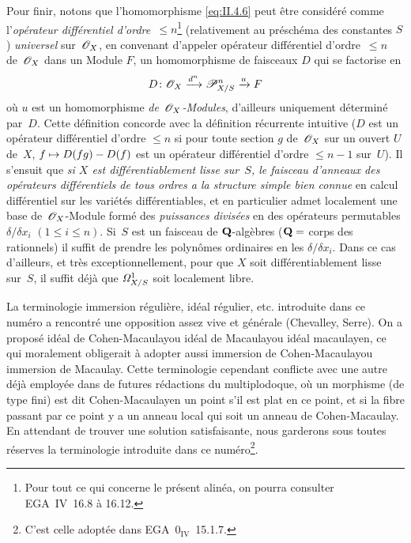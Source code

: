 \begin{remarques}
Pour finir, notons que l'homomorphisme \eqref{eq:II.4.6} peut \^etre
consid\'er\'e comme l'\emph{opé\-ra\-teur différentiel
d'ordre}~$\leq n$\footnote{Pour tout ce qui concerne le pr\'esent
alin\'ea, on pourra consulter EGA~IV~16.8 \`a 16.12.}
(relativement au pr\'esch\'ema des constantes $S$)
\emph{universel}
sur~$\cal{O}_X$, en convenant d'appeler op\'erateur diff\'erentiel
d'ordre~$\leq n$
de~$\cal{O}_X$ dans un Module $F$, un homomorphisme de faisceaux $D$
qui se factorise en
$$
D\colon \cal{O}_X\lto{d^n} \cal{P}_{X/S}^n\lto{u} F
$$
o\`u $u$ est un homomorphisme \emph{de~$\cal{O}_X$-Modules},
d'ailleurs uniquement d\'etermin\'e par~$D$. Cette d\'efinition
concorde avec la d\'efinition r\'ecurrente intuitive ($D$ est un
op\'erateur diff\'erentiel d'ordre $\leq n$ si pour toute section
$g$ de~$\cal{O}_X$ sur un ouvert $U$ de~$X$, $f\mto D(fg)-D(f)$ est
un op\'erateur diff\'erentiel d'ordre $\leq n-1$ sur~$U$). Il
s'ensuit que \emph{si $X$ est différentiablement lisse sur~$S$, le
faisceau d'anneaux des opérateurs différentiels de tous ordres
a la structure simple bien connue} en calcul diff\'erentiel sur les
vari\'et\'es diff\'erentiables, et en particulier admet
localement une base de~$\cal{O}_X$-Module
form\'e 
des \emph{puissances divisées} en des op\'erateurs permutables
$\delta/\delta x_i$ $(1\leq i\leq n)$. Si~$S$ est un faisceau de
$\QQ$-alg\`ebres ($\QQ=$ corps des rationnels) il suffit de prendre
les polyn\^omes ordinaires en les $\delta/\delta x_i$. Dans ce cas
d'ailleurs, et tr\`es exceptionnellement, pour que $X$ soit
diff\'erentiablement lisse sur~$S$, il suffit d\'ej\`a que
$\it{\Omega}_{X/S}^1$ soit localement libre.
\end{remarques}

\begin{remarque}
\label{II.4.19}
La terminologie \og immersion r\'eguli\`ere\fg, \og id\'eal
r\'egulier\fg, etc. introduite dans ce num\'ero a rencontr\'e
une opposition assez vive et g\'en\'erale (Chevalley, Serre). On a
propos\'e \og id\'eal de Cohen-Macaulay\fg ou \og id\'eal de
Macaulay\fg ou \og id\'eal macaulayen\fg, ce qui moralement obligerait
\`a adopter aussi \og immersion de Cohen-Macaulay\fg ou \og immersion de
Macaulay\fg. Cette terminologie cependant conflicte avec une autre
d\'ej\`a employ\'ee dans de futures r\'edactions du
multiplodoque, o\`u un morphisme (de type fini) est dit
\og Cohen-Macaulay\fg en un point s'il est plat en ce point, et si la
fibre passant par ce point y a un anneau local qui soit un anneau de
Cohen-Macaulay. En attendant de trouver une solution satisfaisante,
nous garderons sous toutes r\'eserves la terminologie introduite
dans ce num\'ero\footnote{C'est celle adopt\'ee dans
EGA~$\mathrm{0}_\mathrm{IV}$~15.1.7.}.
\end{remarque}

